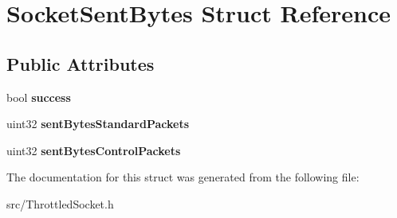 \section{SocketSentBytes Struct Reference}
\label{structSocketSentBytes}
\subsection*{Public Attributes}
\begin{DoxyCompactItemize}
\item 
bool {\bfseries success}\label{structSocketSentBytes_a04f8c46b428b61964d455c2ddfea3aab}

\item 
uint32 {\bfseries sentBytesStandardPackets}\label{structSocketSentBytes_a4009382891fcb6772d5137c77da16dc1}

\item 
uint32 {\bfseries sentBytesControlPackets}\label{structSocketSentBytes_abd8024c613746f3f2a9c134a39f494aa}

\end{DoxyCompactItemize}


The documentation for this struct was generated from the following file:\begin{DoxyCompactItemize}
\item 
src/ThrottledSocket.h\end{DoxyCompactItemize}
